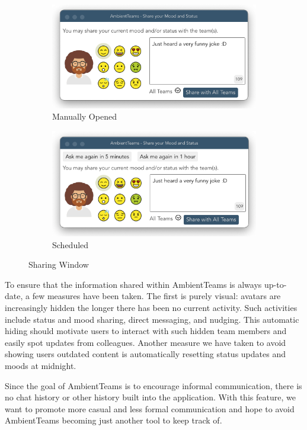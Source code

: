 \begin{figure}[h]
    \centering
    \begin{subfigure}{.5\textwidth}
        \centering
        \includegraphics[width=.8\linewidth]{./images/sharing_manual.png}
        \caption{Manually Opened}
        \label{fig:sharing_manual}
    \end{subfigure}%
    \begin{subfigure}{.5\textwidth}
        \centering
        \includegraphics[width=.8\linewidth]{./images/sharing_auto.png}
        \caption{Scheduled}
        \label{fig:sharing_auto}
    \end{subfigure}
    \caption{Sharing Window}
\end{figure}

To ensure that the information shared within AmbientTeams is always up-to-date, a few measures have been taken. The first is purely visual: avatars are increasingly hidden the longer there has been no current activity. Such activities include status and mood sharing, direct messaging, and nudging. This automatic hiding should motivate users to interact with such hidden team members and easily spot updates from colleagues. Another measure we have taken to avoid showing users outdated content is automatically resetting status updates and moods at midnight.

Since the goal of AmbientTeams is to encourage informal communication, there is no chat history or other history built into the application. With this feature, we want to promote more casual and less formal communication and hope to avoid AmbientTeams becoming just another tool to keep track of.

